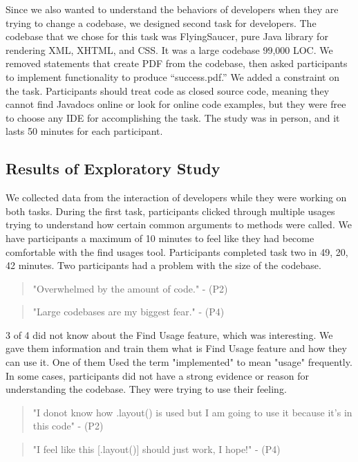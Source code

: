 \documentclass[conference]{IEEEtran}
\begin{document}
Since we also wanted to understand the behaviors of developers when they are trying to change a codebase, we designed second task for developers. The codebase that we chose for this task was FlyingSaucer, pure Java library for rendering XML, XHTML, and CSS. It was a large codebase 99,000 LOC. We removed statements that create PDF from the codebase, then asked participants to implement functionality to produce “success.pdf.” We added a constraint on the task. Participants should treat code as closed source code, meaning they cannot find Javadocs online or look for online code examples, but they were free to choose any IDE for accomplishing the task. The study was in person, and it lasts 50 minutes for each participant. 

\subsection{Results of Exploratory Study}


We collected data from the interaction of developers while they were working on both tasks. During the first task, participants clicked through multiple usages trying to understand how certain common arguments to methods were called. We have participants a maximum of 10 minutes to feel like they had become comfortable with the find usages tool. Participants completed task two in 49, 20, 42 minutes. Two participants had a problem with the size of the codebase.
\begin{quote}"Overwhelmed by the amount of code." - (P2) \end{quote}
\begin{quote}"Large codebases are my biggest fear." - (P4) \end{quote}
3 of 4 did not know about the Find Usage feature, which was interesting. We gave them information and train them what is Find Usage feature and how they can use it. One of them Used the term "implemented" to mean "usage" frequently. In some cases, participants did not have a strong evidence or reason for understanding the codebase. They were trying to use their feeling. 
\begin{quote}"I donot know how .layout() is used but I am going to use it because it's in this code" - (P2) \end{quote}
\begin{quote}"I feel like this [.layout()] should just work, I hope!" - (P4) \end{quote}
\end{document}
